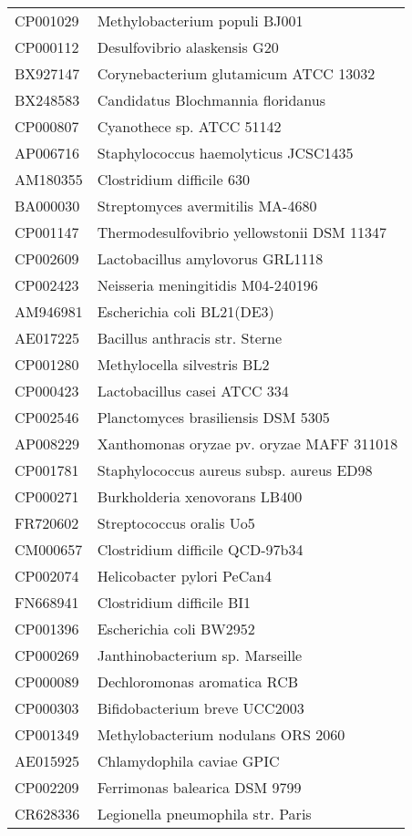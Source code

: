 \begin{longtable}{ll}
CP001029 & Methylobacterium populi BJ001\\
CP000112 & Desulfovibrio alaskensis G20\\
BX927147 & Corynebacterium glutamicum ATCC 13032\\
BX248583 & Candidatus Blochmannia floridanus\\
CP000807 & Cyanothece sp. ATCC 51142\\
AP006716 & Staphylococcus haemolyticus JCSC1435\\
AM180355 & Clostridium difficile 630\\
BA000030 & Streptomyces avermitilis MA-4680\\
CP001147 & Thermodesulfovibrio yellowstonii DSM 11347\\
CP002609 & Lactobacillus amylovorus GRL1118\\
CP002423 & Neisseria meningitidis M04-240196\\
AM946981 & Escherichia coli BL21(DE3)\\
AE017225 & Bacillus anthracis str. Sterne\\
CP001280 & Methylocella silvestris BL2\\
CP000423 & Lactobacillus casei ATCC 334\\
CP002546 & Planctomyces brasiliensis DSM 5305\\
AP008229 & Xanthomonas oryzae pv. oryzae MAFF 311018\\
CP001781 & Staphylococcus aureus subsp. aureus ED98\\
CP000271 & Burkholderia xenovorans LB400\\
FR720602 & Streptococcus oralis Uo5\\
CM000657 & Clostridium difficile QCD-97b34\\
CP002074 & Helicobacter pylori PeCan4\\
FN668941 & Clostridium difficile BI1\\
CP001396 & Escherichia coli BW2952\\
CP000269 & Janthinobacterium sp. Marseille\\
CP000089 & Dechloromonas aromatica RCB\\
CP000303 & Bifidobacterium breve UCC2003\\
CP001349 & Methylobacterium nodulans ORS 2060\\
AE015925 & Chlamydophila caviae GPIC\\
CP002209 & Ferrimonas balearica DSM 9799\\
CR628336 & Legionella pneumophila str. Paris\\

\end{longtable}
